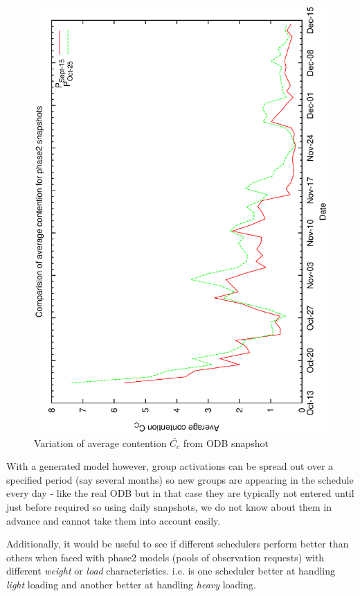 \documentclass[12pt,a4paper]{article}
\begin{document}
{\begin{figure}[h]
\begin{center}
   \includegraphics[scale=0.5, angle=-90]{figures/c60_odb_cav.eps}
  \caption{Variation of average contention $\bar{C_c}$ from ODB snapshot}
 \label{fig:c60_odb_av}
 \end{center}
\end{figure}

 With a generated model however, group activations can be spread out over a specified period (say several months) so new groups are appearing in the schedule every day - like the real ODB but in that case they are typically not entered until just before required so using daily snapshots, we do not know about them in advance and cannot take them into account easily.
   
Additionally, it would be useful to see if different schedulers perform better than others when faced with phase2 models (pools of observation requests) with different \emph{weight} or \emph{load} characteristics.  i.e. is one scheduler better at handling \emph{light} loading and another better at handling \emph{heavy} loading.

}
\end{document}

